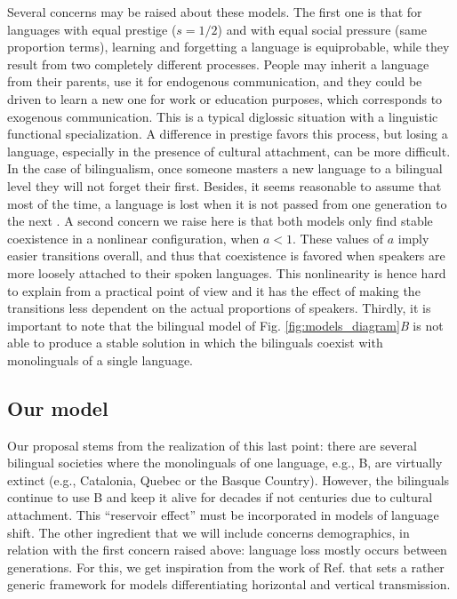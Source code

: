 \documentclass[../thesis.tex]{subfiles}
\begin{document}
Several concerns may be raised about these models. The first one is that for languages
with equal prestige ($s=1/2$) and with equal social pressure (same proportion terms),
learning and forgetting a language is equiprobable, while they result from two
completely different processes. People may inherit a language from their parents, use it
for endogenous communication, and they could be driven to learn a new one for work or
education purposes, which corresponds to exogenous communication. This is a typical
diglossic situation \cite{FergusonDiglossia1959} with a linguistic functional
specialization. A difference in prestige favors this process, but losing a language,
especially in the presence of cultural attachment, can be more difficult. In the case of
bilingualism, once someone masters a new language to a bilingual level they will not
forget their first. Besides, it seems reasonable to assume that most of the time, a
language is lost when it is not passed from one generation to the next
\cite{CrystalLanguageDeath2000,PortesPluribusUnum1998}. A second concern we raise here
is that both models only find stable coexistence in a nonlinear configuration, when $a <
1$. These values of $a$ imply easier transitions overall, and thus that coexistence is
favored when speakers are more loosely attached to their spoken languages. This
nonlinearity is hence hard to explain from a practical point of view and it has the
effect of making the transitions less dependent on the actual proportions of speakers.
Thirdly, it is important to note that the bilingual model of Fig.
\ref{fig:models_diagram}\textit{B} is not able to produce a stable solution in which the
bilinguals coexist with monolinguals of a single language.


\subsection{Our model}
Our proposal stems from the realization of this last point: there are several bilingual
societies where the monolinguals of one language, e.g., B, are virtually extinct (e.g.,
Catalonia, Quebec or the Basque Country). However, the bilinguals continue to use B and
keep it alive for decades if not centuries due to cultural attachment. This ``reservoir
effect'' must be incorporated in models of language shift. The other ingredient that we
will include concerns demographics, in relation with the first concern raised above:
language loss mostly occurs between generations. For this, we get inspiration from the
work of Ref. \cite{MinettModellingEndangered2008} that sets a rather generic framework
for models differentiating horizontal and vertical transmission.
\end{document}
